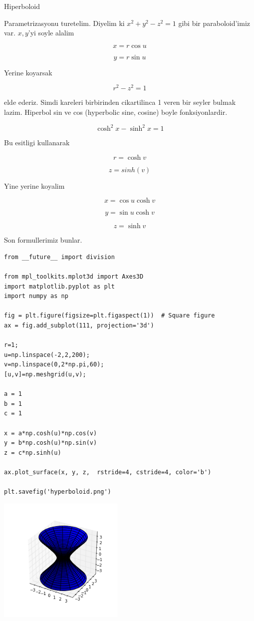 \documentclass[12pt,fleqn]{article}\usepackage{../common}
\begin{document}
Hiperboloid 

Parametrizasyonu turetelim. Diyelim ki $x^2 + y^2 - z^2 = 1$ gibi bir
paraboloid'imiz var. $x,y$'yi soyle alalim

\[ x = r \cos u \]

\[ y = r \sin u \]

Yerine koyarsak

\[ r^2 - z^2 = 1 \]

elde ederiz. Simdi kareleri birbirinden cikartilinca 1 veren bir seyler
bulmak lazim. Hiperbol sin ve cos (hyperbolic sine, cosine) boyle
fonksiyonlardir. 

\[ \cosh^2x - \sinh^2x = 1 \]

Bu esitligi kullanarak 

\[ r = \cosh v \]

\[ z = sinh(v) \]

Yine yerine koyalim

\[ x = \cos u \cosh v \]

\[ y = \sin u \cosh v \]

\[ z = \sinh v \]

Son formullerimiz bunlar.

\begin{verbatim}
from __future__ import division

from mpl_toolkits.mplot3d import Axes3D
import matplotlib.pyplot as plt
import numpy as np

fig = plt.figure(figsize=plt.figaspect(1))  # Square figure
ax = fig.add_subplot(111, projection='3d')

r=1;
u=np.linspace(-2,2,200);
v=np.linspace(0,2*np.pi,60);
[u,v]=np.meshgrid(u,v);

a = 1
b = 1
c = 1

x = a*np.cosh(u)*np.cos(v)
y = b*np.cosh(u)*np.sin(v)
z = c*np.sinh(u)

ax.plot_surface(x, y, z,  rstride=4, cstride=4, color='b')

plt.savefig('hyperboloid.png')
\end{verbatim}

\includegraphics[height=6cm]{hyperboloid.png}
\end{document}
